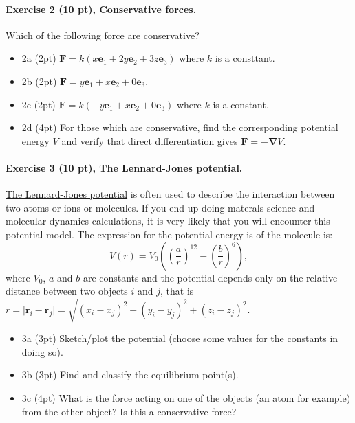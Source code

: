 \documentclass[%
oneside,                 %
final,                   %
10pt]{article}
\begin{document}
\paragraph{Exercise 2 (10 pt), Conservative forces.}
Which of the following force are conservative?
\begin{itemize}
\item 2a (2pt) $\bm{F}=k(x\bm{e}_1+2y\bm{e}_2+3z\bm{e}_3)$ where $k$ is a consttant.

\item 2b (2pt) $\bm{F}=y\bm{e}_1+x\bm{e}_2+0\bm{e}_3$.

\item 2c (2pt) $\bm{F}=k(-y\bm{e}_1+x\bm{e}_2+0\bm{e}_3)$ where $k$ is a constant.

\item 2d (4pt) For those which are conservative, find the corresponding potential energy $V$ and verify that direct differentiation gives $\bm{F}=-\bm{\nabla}V$.
\end{itemize}

\noindent
\paragraph{Exercise 3 (10 pt), The Lennard-Jones potential.}
\href{{https://en.wikipedia.org/wiki/Lennard-Jones_potential}}{The Lennard-Jones potential} is often used to describe
the interaction between two atoms or ions or molecules. If you end up doing materals science and molecular dynamics calculations, it is very likely that you will encounter this potential model.
The expression for the potential energy is
of the molecule is:
\[
V(r) = V_0\left((\frac{a}{r})^{12}-(\frac{b}{r})^{6}\right),
\]
where $V_0$, $a$ and $b$ are constants and the potential depends only on the relative distance between two objects
$i$ and $j$, that is $r=\vert\bm{r}_i-\bm{r}_j\vert=\sqrt{(x_i-x_j)^2+(y_i-y_j)^2+(z_i-z_j)^2}$.

\begin{itemize}
\item 3a (3pt) Sketch/plot the potential (choose some values for the constants in doing so).

\item 3b (3pt) Find and classify the equilibrium point(s).

\item 3c (4pt) What is the force acting on one of the objects (an atom for example) from the other object? Is this a conservative force?
\end{itemize}
\end{document}
